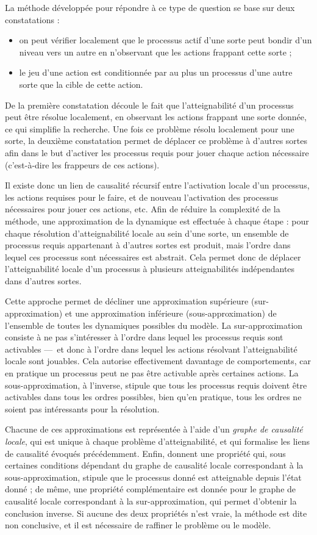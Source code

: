 La méthode développée pour répondre à ce type de question
se base sur deux constatations :
\begin{itemize}
  \item on peut vérifier localement que le processus actif d'une sorte peut
    bondir d'un niveau vers un autre en n'observant que les actions frappant cette sorte ;
  \item le jeu d'une action est conditionnée par au plus un processus d'une autre sorte
    que la cible de cette action.
\end{itemize}
De la première constatation découle le fait que l'atteignabilité d'un processus
peut être résolue localement, en observant les actions frappant une sorte donnée,
ce qui simplifie la recherche.
Une fois ce problème résolu localement pour une sorte, 
la deuxième constatation permet de déplacer ce problème
à d'autres sortes afin dans le but d'activer les processus requis
pour jouer chaque action nécessaire (c'est-à-dire les frappeurs de ces actions).

Il existe donc un lien de causalité récursif entre l'activation locale d'un processus,
les actions requises pour le faire, et de nouveau l'activation des processus
nécessaires pour jouer ces actions, etc.
Afin de réduire la complexité de la méthode,
une approximation de la dynamique est effectuée à chaque étape :
pour chaque résolution d'atteignabilité locale au sein d'une sorte,
un ensemble de processus requis appartenant à d'autres sortes est produit,
mais l'ordre dans lequel ces processus sont nécessaires est abstrait.
Cela permet donc de déplacer l'atteignabilité locale d'un processus
à plusieurs atteignabilités indépendantes dans d'autres sortes.

Cette approche permet de décliner une approximation supérieure (sur-approximation)
et une approximation inférieure (sous-approximation)
de l'ensemble de toutes les dynamiques possibles du modèle.
La sur-approximation consiste à ne pas s'intéresser à l'ordre dans lequel les processus requis
sont activables ---~et donc à l'ordre dans lequel les actions résolvant l'atteignabilité
locale sont jouables.
Cela autorise effectivement davantage de comportements, car en pratique un processus
peut ne pas être activable après certaines actions.
La sous-approximation, à l'inverse, stipule que tous les processus requis doivent
être activables dans tous les ordres possibles,
bien qu'en pratique, tous les ordres ne soient pas intéressants pour la résolution.

Chacune de ces approximations est représentée à l'aide d'un \emph{graphe de causalité locale},
qui est unique à chaque problème d'atteignabilité,
et qui formalise les liens de causalité évoqués précédemment.
Enfin,  donnent une propriété qui, sous certaines conditions dépendant du
graphe de causalité locale correspondant à la sous-approximation,
stipule que le processus donné est atteignable depuis l'état donné ;
de même, une propriété complémentaire est donnée pour le graphe de causalité locale
correspondant à la sur-approximation, qui permet d'obtenir la conclusion inverse.
Si aucune des deux propriétés n'est vraie, la méthode est dite non conclusive,
et il est nécessaire de raffiner le problème ou le modèle.

